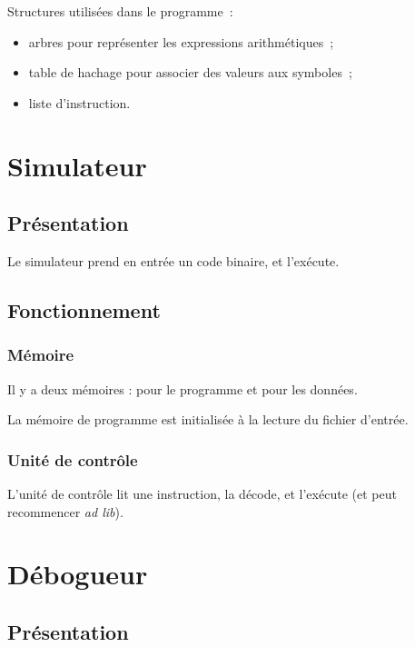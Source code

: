 \documentclass{beamer}
\begin{document}
\begin{frame}
Structures utilisées dans le programme~:
\begin{itemize}
\item arbres pour représenter les expressions arithmétiques~;
\item table de hachage pour associer des valeurs aux symboles~;
\item liste d'instruction.
\end{itemize}
\end{frame}

\section{Simulateur}
\subsection{Présentation}
\begin{frame}
Le simulateur prend en entrée un code binaire, et l'exécute.
\end{frame}

\subsection{Fonctionnement}
\begin{frame}
\frametitle{Mémoire}
	Il y a deux mémoires : pour le programme et pour les données.
	
	La mémoire de programme est initialisée à la lecture du fichier d'entrée.
\end{frame}

\begin{frame}
\frametitle{Unité de contrôle}
L'unité de contrôle lit une instruction, la décode, et l'exécute (et peut recommencer \emph{ad lib}).
\end{frame}

\section{Débogueur}
\subsection{Présentation}
\end{document}
